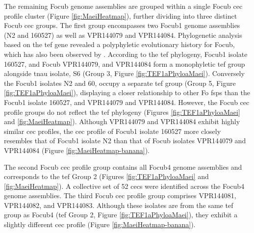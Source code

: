 The remaining \ac{Focub} genome assemblies are grouped within a single \ac{Focub} \ac{cec} profile cluster (Figure \ref{fig:MaeiHeatmap}), further dividing into three distinct \ac{Focub} \ac{cec} groups. The first group encompasses two \ac{Focub1} genome assemblies (N2 and 160527) as well as VPR144079 and VPR144084. Phylogenetic analysis based on the \ac{tef} gene revealed a polyphyletic evolutionary history for \ac{Focub}, which has also been observed by \textcite{Maryani2019, Mostert2022}. According to the \ac{tef} phylogeny, \ac{Focub1} isolate 160527, and \ac{Focub} VPR144079, and VPR144084 form a monophyletic \ac{tef} group alongside \ac{tnau} isolate, S6 (Group 3, Figure \ref{fig:TEF1aPhyloaMaei}). Conversely the \ac{Focub1} isolates N2 and 60, occupy a separate \ac{tef} group (Group 5, Figure \ref{fig:TEF1aPhyloaMaei}), displaying a closer relationship to other \ac{Fo} \acp{fsp} than the \ac{Focub1} isolate 160527, and VPR144079 and VPR144084. However, the \ac{Focub} \ac{cec} profile groups do not reflect the \ac{tef} phylogeny (Figures  \ref{fig:TEF1aPhyloaMaei} and \ref{fig:MaeiHeatmap}). Although VPR144079 and VPR144084 exhibit highly similar \ac{cec} profiles, the \ac{cec} profile of \ac{Focub1} isolate 160527 more closely resembles that of \ac{Focub1} isolate N2 than that of \ac{Focub} isolates VPR144079 and VPR144084 (Figure \ref{fig:MaeiHeatmap-banana}).

The second \ac{Focub} \ac{cec} profile group contains all \ac{Focub4} genome assemblies and corresponds to the \ac{tef} Group 2 (Figures  \ref{fig:TEF1aPhyloaMaei} and \ref{fig:MaeiHeatmap}). A collective set of 52 \acp{cec} were identified across the \ac{Focub4} genome assemblies. The third  \ac{Focub} \ac{cec} profile group comprises VPR144081, VPR144082, and VPR144083. Although these isolates are from the same \ac{tef} group as \ac{Focub4} (\ac{tef} Group 2, Figure \ref{fig:TEF1aPhyloaMaei}), they exhibit a slightly different \ac{cec} profile (Figure \ref{fig:MaeiHeatmap-banana}). 


